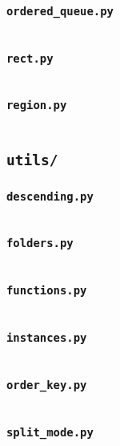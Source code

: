 \subsubsection{\texttt{ordered\_queue.py}}\label{subsubsec:ordered_queue.py}
\inputminted{py}{src/model/ordered_queue.py}

\subsubsection{\texttt{rect.py}}\label{subsubsec:rect.py}
\inputminted{py}{src/model/rect.py}

\subsubsection{\texttt{region.py}}\label{subsubsec:region.py}
\inputminted{py}{src/model/region.py}

\subsection{\texttt{utils/}}\label{subsec:utils/}

\subsubsection{\texttt{descending.py}}\label{subsubsec:descending.py}
\inputminted{py}{src/utils/descending.py}

\subsubsection{\texttt{folders.py}}\label{subsubsec:folders.py}
\inputminted{py}{src/utils/folders.py}

\subsubsection{\texttt{functions.py}}\label{subsubsec:functions.py}
\inputminted{py}{src/utils/functions.py}

\subsubsection{\texttt{instances.py}}\label{subsubsec:instances.py}
\inputminted{py}{src/utils/instances.py}

\subsubsection{\texttt{order\_key.py}}\label{subsubsec:order_key.py}
\inputminted{py}{src/utils/order_key.py}

\subsubsection{\texttt{split\_mode.py}}\label{subsubsec:split_mode.py}
\inputminted{py}{src/utils/split_mode.py}
